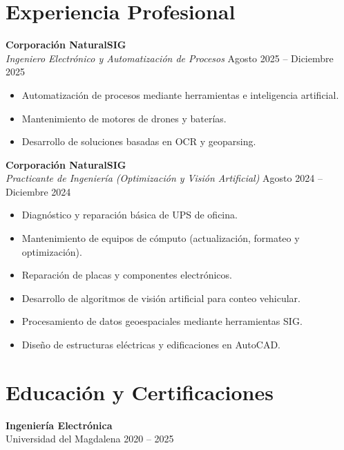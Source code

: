 \documentclass[11pt,a4paper]{article}
\begin{document}
\section*{Experiencia Profesional}

\textbf{Corporación NaturalSIG} \\
\textit{Ingeniero Electrónico y Automatización de Procesos} \hfill Agosto 2025 -- Diciembre 2025

\begin{itemize}[leftmargin=*]
    \item Automatización de procesos mediante herramientas e inteligencia artificial.
    \item Mantenimiento de motores de drones y baterías.
    \item Desarrollo de soluciones basadas en OCR y geoparsing.
\end{itemize}

\vspace{2mm}

\textbf{Corporación NaturalSIG} \\
\textit{Practicante de Ingeniería (Optimización y Visión Artificial)} \hfill Agosto 2024 -- Diciembre 2024

\begin{itemize}[leftmargin=*]
    \item Diagnóstico y reparación básica de UPS de oficina.
    \item Mantenimiento de equipos de cómputo (actualización, formateo y optimización).
    \item Reparación de placas y componentes electrónicos.
    \item Desarrollo de algoritmos de visión artificial para conteo vehicular.
    \item Procesamiento de datos geoespaciales mediante herramientas SIG.
    \item Diseño de estructuras eléctricas y edificaciones en AutoCAD.
\end{itemize}

\section*{Educación y Certificaciones}

\textbf{Ingeniería Electrónica} \\
Universidad del Magdalena \hfill 2020 -- 2025
\end{document}
